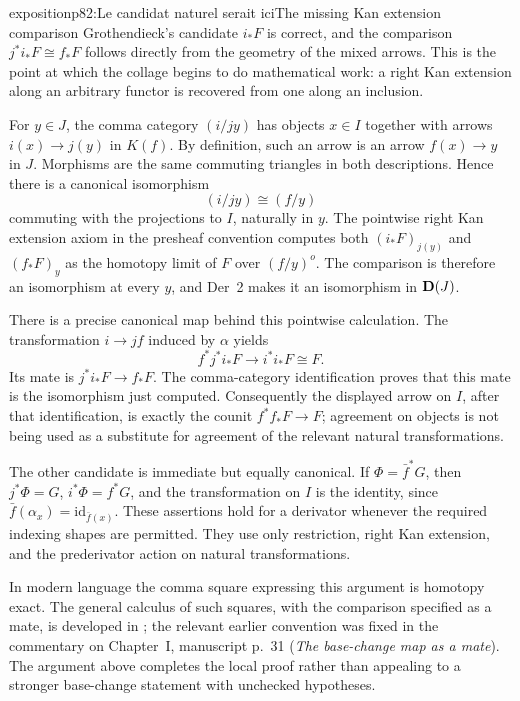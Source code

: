 \begin{dcomment}{exposition}{p82:Le candidat naturel serait ici}{The missing Kan extension comparison}
Grothendieck's candidate \(i_*F\) is correct, and the comparison \(j^*i_*F\cong f_*F\) follows directly from the geometry of the mixed arrows. This is the point at which the collage begins to do mathematical work: a right Kan extension along an arbitrary functor is recovered from one along an inclusion.

For \(y\in J\), the comma category \((i/jy)\) has objects \(x\in I\) together with arrows \(i(x)\to j(y)\) in \(K(f)\). By definition, such an arrow is an arrow \(f(x)\to y\) in \(J\). Morphisms are the same commuting triangles in both descriptions. Hence there is a canonical isomorphism
\[
 (i/jy)\cong(f/y)
\]
commuting with the projections to \(I\), naturally in \(y\). The pointwise right Kan extension axiom in the presheaf convention computes both
\((i_*F)_{j(y)}\) and \((f_*F)_y\) as the homotopy limit of \(F\) over \((f/y)^o\). The comparison is therefore an isomorphism at every \(y\), and Der~2 makes it an isomorphism in \(\mathbf{D}(J)\).

There is a precise canonical map behind this pointwise calculation. The transformation
\(i\to jf\) induced by \(\alpha\) yields
\[
 f^*j^*i_*F\longrightarrow i^*i_*F\cong F.
\]
Its mate is \(j^*i_*F\to f_*F\). The comma-category identification proves that this mate is the isomorphism just computed. Consequently the displayed arrow on \(I\), after that identification, is exactly the counit \(f^*f_*F\to F\); agreement on objects is not being used as a substitute for agreement of the relevant natural transformations.

The other candidate is immediate but equally canonical. If \(\Phi=\bar f^*G\), then \(j^*\Phi=G\), \(i^*\Phi=f^*G\), and the transformation on \(I\) is the identity, since \(\bar f(\alpha_x)=\mathrm{id}_{\bar f(x)}\). These assertions hold for a derivator whenever the required indexing shapes are permitted. They use only restriction, right Kan extension, and the prederivator action on natural transformations.

In modern language the comma square expressing this argument is homotopy exact. The general calculus of such squares, with the comparison specified as a mate, is developed in \citet[Proposition 1.26]{Groth2013}; the relevant earlier convention was fixed in the commentary on Chapter~I, manuscript p.~31 (\emph{The base-change map as a mate}). The argument above completes the local proof rather than appealing to a stronger base-change statement with unchecked hypotheses.
\end{dcomment}


